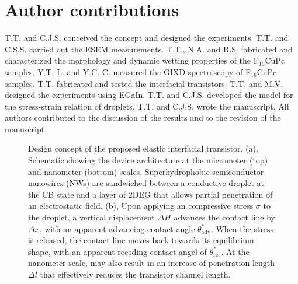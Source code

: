 \section{Author contributions}
\label{sec:small-contrib}
T.T. and C.J.S. conceived the concept and designed the
experiments. T.T. and C.S.S. carried out the ESEM
measurements. T.T., N.A. and R.S. fabricated and characterized the
morphology and dynamic wetting properties of the F\(_{\text{16}}\)CuPc
samples. Y.T. L. and Y.C. C. measured the GIXD spectroscopy of
F\(_{\text{16}}\)CuPc samples. T.T. fabricated and tested the interfacial
transistors. T.T. and M.V. designed the experiments using
EGaIn. T.T. and C.J.S. developed the model for the stress-strain
relation of droplets. T.T. and C.J.S. wrote the manuscript. All
authors contributed to the discussion of the results and to the
revision of the manuscript.



% 

\newpage{}

\begin{figure}[htbp]
\centering
\caption{\label{fig:small-main-1}
Design concept of the proposed elastic interfacial transistor. (a), Schematic showing the device architecture at the micrometer (top) and nanometer (bottom) scales. Superhydrophobic semiconductor nanowires (NWs) are sandwiched between a conductive droplet at the CB state and a layer of 2DEG that allows partial penetration of an electrostatic field. (b), Upon applying an compressive stress \(\sigma\) to the droplet, a vertical displacement \(\Delta H\) advances the contact line by \(\Delta x\), with an apparent advancing contact angle \(\theta_{\mathrm{adv}}^{*}\). When the stress is released, the contact line moves back towards its equilibrium shape, with an apparent receding contact angel of \(\theta_{\mathrm{rec}}^{*}\). At the nanometer scale,  may also result in an increase of penetration length \(\Delta l\) that effectively reduces the transistor channel length.}
\end{figure}


